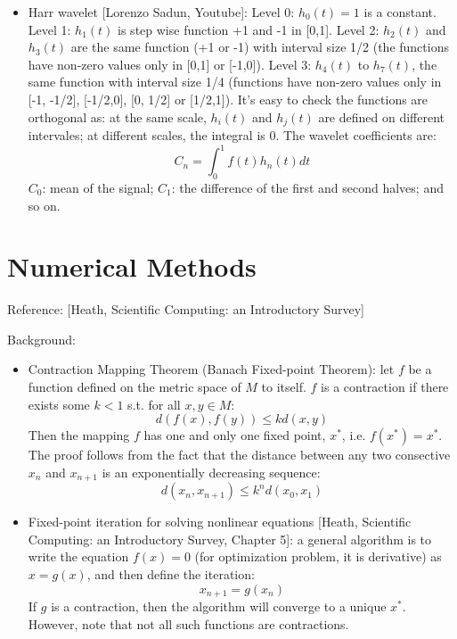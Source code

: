 \documentclass{report}
\begin{document}
\begin{itemize}
	\item Harr wavelet [Lorenzo Sadun, Youtube]: Level 0: $h_0(t) = 1$ is a constant. Level 1: $h_1(t)$ is step wise function +1 and -1 in [0,1]. Level 2: $h_2(t)$ and $h_3(t)$ are the same function (+1 or -1) with interval size 1/2 (the functions have non-zero values only in [0,1] or [-1,0]). Level 3: $h_4(t)$ to $h_7(t)$, the same function with interval size 1/4 (functions have non-zero values only in [-1, -1/2], [-1/2,0], [0, 1/2] or [1/2,1]). It's easy to check the functions are orthogonal as: at the same scale, $h_i(t)$ and $h_j(t)$ are defined on different intervales; at different scales, the integral is 0. The wavelet coefficients are: 
	\begin{equation}
	C_n = \int_0^1 f(t) h_n(t) dt
	\end{equation}
	$C_0$: mean of the signal; $C_1$: the difference of the first and second halves; and so on. 
	 
\end{itemize}

\section{Numerical Methods}

Reference: [Heath, Scientific Computing: an Introductory Survey]

Background: 
\begin{itemize}
	\item Contraction Mapping Theorem (Banach Fixed-point Theorem): let $f$ be a function defined on the metric space of $M$ to itself. $f$ is a contraction if there exists some $k < 1$ s.t. for all $x, y \in M$: 
	\begin{equation}
	d(f(x), f(y)) \leq k d(x,y)	
	\end{equation}
	Then the mapping $f$ has one and only one fixed point, $x^*$, i.e. $f(x^*) = x^*$. The proof follows from the fact that the distance between any two consective $x_n$ and $x_{n+1}$ is an exponentially decreasing sequence: 
	\begin{equation}
	d(x_n, x_{n+1}) \leq k^n d(x_0, x_1)	
	\end{equation}
	
	\item Fixed-point iteration for solving nonlinear equations [Heath, Scientific Computing: an Introductory Survey, Chapter 5]: a general algorithm is to write the equation $f(x) = 0$ (for optimization problem, it is derivative) as $x = g(x)$, and then define the iteration: 
	\begin{equation}
	x_{n+1} = g(x_n)
	\end{equation}
	If $g$ is a contraction, then the algorithm will converge to a unique $x^*$. However, note that not all such functions are contractions. 
\end{itemize}
\end{document}
